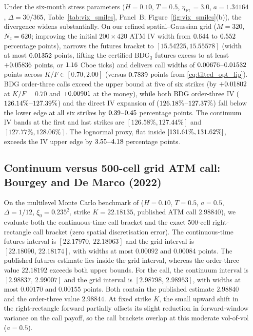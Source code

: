 Under the six-month stress parameters ($H=0.10$, $T=0.5$, $\eta_{\mathrm{P1}}=3.0$, $a=1.34164$,
$\Delta=30/365$, Table~\ref{tab:vix_smiles}, Panel~B; Figure~\ref{fig:vix_smiles}(b)), the divergence
widens substantially. On our refined spatial--Gaussian grid ($M=320$, $N_z=620$; improving the initial
$200\times 420$ ATM IV width from $0.644$ to $0.552$ percentage points), \RoughCertCV{} narrows the futures
bracket to $[15.54225,15.55578]$ (width at most $0.01352$ points, lifting the certified BDG$_3$ futures
excess to at least $+0.05836$ points, or $1.16$ Cboe ticks) and delivers call widths of $0.00676$--$0.01532$ points across
$K/F\in[0.70,2.00]$ (versus $0.7839$ points from \eqref{eq:tilted_opt_lip}). BDG order-three calls exceed
the \RoughCertCV{} upper bound at five of six strikes (by $+0.01802$ at $K/F=0.70$ and $+0.00901$ at the
money), while both BDG order-three IV ($126.14\%$--$127.39\%$) and the direct IV expansion of
\citet{LiaoAgarwalBourgey2026} ($126.18\%$--$127.37\%$) fall below the lower edge at all six
strikes by $0.39$--$0.45$ percentage points. The continuum IV bands at the first and last strikes are $[126.58\%,127.44\%]$ and $[127.77\%,128.06\%]$.
The lognormal proxy, flat inside $[131.61\%,131.62\%]$, exceeds the IV upper edge by
$3.55$--$4.18$ percentage points.

\subsection{Continuum versus 500-cell grid ATM call: Bourgey and De Marco (2022)}\label{sec:bd2022_call}
On the multilevel Monte Carlo benchmark of \citet[Section~3.3]{BourgeyDeMarco2022} ($H=0.10$, $T=0.5$,
$a=0.5$, $\Delta=1/12$, $\xi_0=0.235^2$, strike $K=22.18135$, published ATM call $2.98840$), we evaluate
both the continuous-time \RoughCertCV{} call bracket and the exact $500$-cell right-rectangle
\RoughCertCV{} call bracket (zero spatial discretisation error). The continuous-time futures interval is $[22.17970,\,22.18063]$ and the grid interval is $[22.18090,\,22.18174]$, with widths at most $0.00092$ and $0.00084$ points. The published futures estimate lies inside the grid interval, whereas the order-three value $22.18192$ exceeds both upper bounds.
For the call, the continuum interval is $[2.98837,\,2.99007]$ and the grid interval is $[2.98798,\,2.98953]$, with widths at most $0.00170$ and $0.00155$ points. Both contain the published estimate $2.98840$ and the order-three value $2.98844$. At fixed strike $K$, the small upward shift in the right-rectangle forward partially
offsets its slight reduction in forward-window variance on the call payoff, so the call brackets overlap
at this moderate vol-of-vol ($a=0.5$).

